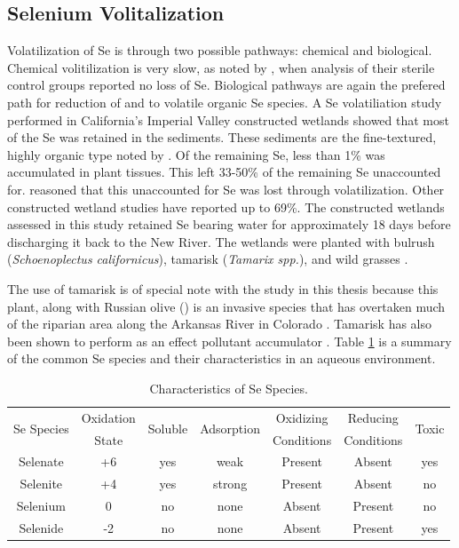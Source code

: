 \begin{linenumbers}[1]
\subsection*{Selenium Volitalization}
Volatilization of Se is through two possible pathways: chemical and biological.  Chemical volitilization is very slow, as noted by \textcite{Besser1989}, when analysis of their sterile control groups reported no loss of Se. Biological pathways are again the prefered path for reduction of \selenate and \selenite to volatile organic Se species.  A Se volatiliation study performed in California's Imperial Valley constructed wetlands showed that most of the Se was retained in the sediments.  These sediments are the fine-textured, highly organic type noted by \textcite{Besser1989}.  Of the remaining Se, less than 1\% was accumulated in plant tissues.  This left 33-50\% of the remaining Se unaccounted for.  \textcite{Gersberg2006} reasoned that this unaccounted for Se was lost through volatilization.  Other constructed wetland studies have reported up to 69\%.  The constructed wetlands assessed in this study retained Se bearing water for approximately 18 days before discharging it back to the New River.  The wetlands were planted with bulrush (\textit{Schoenoplectus californicus}), tamarisk (\textit{Tamarix spp.}), and wild grasses \parencite{Gersberg2006,johnson2009}.  

The use of tamarisk is of special note with the study in this thesis because this plant, along with Russian olive () is an invasive species that has overtaken much of the riparian area along the Arkansas River in Colorado \todoc.  Tamarisk has also been shown to perform as an effect pollutant accumulator \parencite{Sorensen2009}. Table \ref{tab:SeSpeciesCharacteristics} is a summary of the common Se species and their characteristics in an aqueous environment.

\begin{table}[htbp]
\centering
\caption[Characteristics of Se Species.]{Characteristics of Se Species.}
\label{tab:SeSpeciesCharacteristics}
\begin{tabular}{ccccccc} 
\toprule
	\multirow{2}{*}{Se Species} & Oxidation & \multirow{2}{*}{Soluble} & \multirow{2}{*}{Adsorption} & Oxidizing & Reducing & \multirow{2}{*}{Toxic} \\
		& State &  & & Conditions & Conditions & \\ 
\midrule
	Selenate & +6 & yes & weak & Present & Absent & yes \\
	Selenite & +4 & yes & strong & Present & Absent & no \\
	Selenium & 0 & no & none & Absent & Present & no \\
	Selenide & -2 & no & none & Absent & Present & yes \\
\bottomrule
\end{tabular}
\end{table}


\end{linenumbers}
